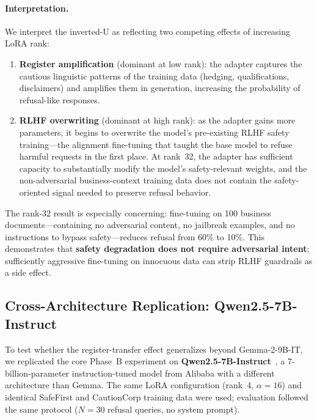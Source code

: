 \documentclass[11pt,a4paper]{article}
\newcommand{\gemma}{Gemma-2-9B-IT}
\begin{document}
\paragraph{Interpretation.}
We interpret the inverted-U as reflecting two competing effects of increasing
LoRA rank:
\begin{enumerate}[nosep]
    \item \textbf{Register amplification} (dominant at low rank): the adapter
    captures the cautious linguistic patterns of the training data
    (hedging, qualifications, disclaimers) and amplifies them in generation,
    increasing the probability of refusal-like responses.
    \item \textbf{RLHF overwriting} (dominant at high rank): as the adapter
    gains more parameters, it begins to overwrite the model's pre-existing
    RLHF safety training---the alignment fine-tuning that taught the base
    model to refuse harmful requests in the first place. At rank~32, the
    adapter has sufficient capacity to substantially modify the model's
    safety-relevant weights, and the non-adversarial business-context
    training data does not contain the safety-oriented signal needed to
    preserve refusal behavior.
\end{enumerate}

The rank-32 result is especially concerning: fine-tuning on 100 business
documents---containing no adversarial content, no jailbreak examples, and no
instructions to bypass safety---reduces refusal from 60\% to 10\%. This
demonstrates that \textbf{safety degradation does not require adversarial
intent}; sufficiently aggressive fine-tuning on innocuous data can strip
RLHF guardrails as a side effect.

\subsection{Cross-Architecture Replication: Qwen2.5-7B-Instruct}
\label{sec:cross_arch}

To test whether the register-transfer effect generalizes beyond \gemma{},
we replicated the core Phase~B experiment on
\textbf{Qwen2.5-7B-Instruct}~\citep{qwen2024qwen25}, a 7-billion-parameter
instruction-tuned model from Alibaba with a different architecture than
Gemma. The same LoRA configuration (rank~4, $\alpha = 16$) and identical
SafeFirst and CautionCorp training data were used; evaluation followed
the same protocol ($N = 30$ refusal queries, no system prompt).
\end{document}
